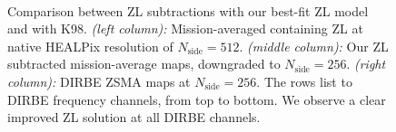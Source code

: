\documentclass[twocolumn]{aa}
\begin{document}
\begin{figure}
    \\
    \caption{Comparison between ZL subtractions with our best-fit ZL model and with K98. 
    \textit{(left column):} Mission-averaged containing ZL at native HEALPix resolution 
    of $N_\mathrm{side} = 512$. \textit{(middle column):} Our ZL subtracted mission-average 
    maps, downgraded to $N_\mathrm{side} = 256$. \textit{(right column):} DIRBE ZSMA maps
    at $N_\mathrm{side} = 256$. The rows list to DIRBE frequency channels, from top to 
    bottom. We observe a clear improved ZL solution at all DIRBE channels.
    }
    \label{fig:dr2-zsma-compare1}
\end{figure}
\end{document}
